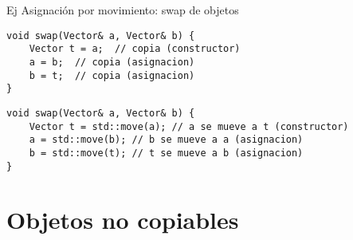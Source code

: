 \begin{frame}[fragile]{Ej Asignaci\'on por movimiento: swap de objetos}{}
        \begin{lstlisting}[style=normal,firstnumber=10]
void swap(Vector& a, Vector& b) {
    Vector t = a;  // copia (constructor)
    a = b;  // copia (asignacion)
    b = t;  // copia (asignacion)
}
        \end{lstlisting}
        \begin{lstlisting}[style=normal,firstnumber=10]
void swap(Vector& a, Vector& b) {
    Vector t = std::move(a); // a se mueve a t (constructor)
    a = std::move(b); // b se mueve a a (asignacion)
    b = std::move(t); // t se mueve a b (asignacion)
}
        \end{lstlisting}
\end{frame}


%
%
%
%
%
%
%

\section{Objetos no copiables}
